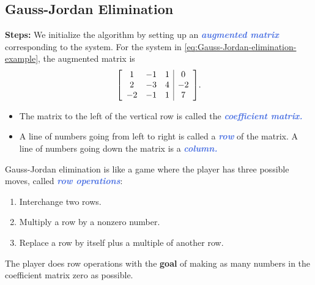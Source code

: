\documentclass[10pt]{article}
\newcommand{\demph}[1]{\textcolor{RoyalBlue}{\textbf{\slshape #1}}} %
\newenvironment{augmentedmatrix}[1] %
{\left[\begin{array}{#1}}
    {\end{array}\right]}
\theoremstyle{definition}
\newcommand{\Fl}[1]{\vspace{5mm}\noindent\textbf{#1}}%
\begin{document}
\subsection{Gauss-Jordan Elimination}
\Fl{Steps:} We initialize the algorithm by setting up an \demph{augmented
  matrix} corresponding to the system. For the system in
\eqref{eq:Gauss-Jordan-elimination-example}, the augmented matrix is
\begin{equation*}
  \begin{augmentedmatrix}{ccc|c}
    1& -1& 1& 0 \\
    2& -3& 4& -2 \\
    -2& -1& 1& 7
  \end{augmentedmatrix}.
\end{equation*}

\begin{itemize}
  \item The matrix to the left of the vertical row is called the
  \demph{coefficient matrix.}
  \item A line of numbers going from left to right is called a \demph{row} of the
  matrix. A line of numbers going down the matrix is a \demph{column.}
\end{itemize}



Gauss-Jordan elimination is like a game where the player has three possible
moves, called \demph{row operations}:
\begin{enumerate}
  \item Interchange two rows.
  \item Multiply a row by a nonzero number.
  \item Replace a row by itself plus a multiple of another row.
\end{enumerate}
The player does row operations with the \textbf{goal} of making as many
numbers in the coefficient matrix zero as possible.
\end{document}
